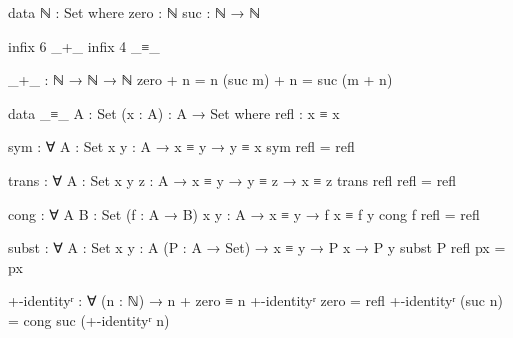 \documentclass{article}
\begin{document}
\begin{prev}
\begin{code}
data ℕ : Set where
  zero : ℕ
  suc  : ℕ → ℕ


infix 6 _+_
infix 4 _≡_

_+_ : ℕ → ℕ → ℕ
zero + n = n
(suc m) + n = suc (m + n)

data _≡_ {A : Set} (x : A) : A → Set where
  refl : x ≡ x

sym : ∀ {A : Set} {x y : A} → x ≡ y → y ≡ x
sym refl = refl

trans : ∀ {A : Set} {x y z : A} → x ≡ y → y ≡ z → x ≡ z
trans refl refl = refl

cong : ∀ {A B : Set} (f : A → B) {x y : A} → x ≡ y → f x ≡ f y
cong f refl = refl

subst : ∀ {A : Set} {x y : A} (P : A → Set) → x ≡ y → P x → P y
subst P refl px = px

+-identityʳ : ∀ (n : ℕ) → n + zero ≡ n
+-identityʳ zero = refl
+-identityʳ (suc n) = cong suc (+-identityʳ n)
\end{code}
\end{prev}
\end{document}
